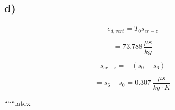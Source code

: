 

\subsection*{d)}

\[
e_{d,vert} = \overline{T_0} s_{er-z}
\]

\[
= 73.788 \, \frac{\mu s}{kg}
\]

\[
s_{er-z} = -(s_0 - s_6)
\]

\[
= s_6 - s_0 = 0.307 \, \frac{\mu s}{kg \cdot K}
\]

``````latex
